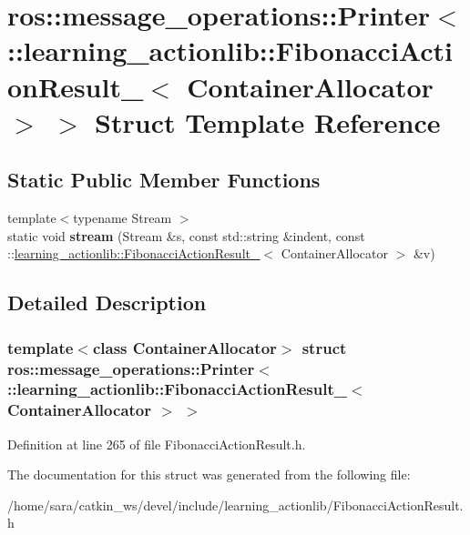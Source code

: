 \hypertarget{structros_1_1message__operations_1_1Printer_3_01_1_1learning__actionlib_1_1FibonacciActionResult378bca1585299c2b313fd76380541e51}{}\section{ros\+:\+:message\+\_\+operations\+:\+:Printer$<$ \+:\+:learning\+\_\+actionlib\+:\+:Fibonacci\+Action\+Result\+\_\+$<$ Container\+Allocator $>$ $>$ Struct Template Reference}
\label{structros_1_1message__operations_1_1Printer_3_01_1_1learning__actionlib_1_1FibonacciActionResult378bca1585299c2b313fd76380541e51}
\subsection*{Static Public Member Functions}
\begin{DoxyCompactItemize}
\item 
\mbox{\label{structros_1_1message__operations_1_1Printer_3_01_1_1learning__actionlib_1_1FibonacciActionResult378bca1585299c2b313fd76380541e51_a88661785a3e73ee7fdb40e426925f0eb}} 
{\footnotesize template$<$typename Stream $>$ }\\static void {\bfseries stream} (Stream \&s, const std\+::string \&indent, const \+::\hyperlink{structlearning__actionlib_1_1FibonacciActionResult__}{learning\+\_\+actionlib\+::\+Fibonacci\+Action\+Result\+\_\+}$<$ Container\+Allocator $>$ \&v)
\end{DoxyCompactItemize}


\subsection{Detailed Description}
\subsubsection*{template$<$class Container\+Allocator$>$\newline
struct ros\+::message\+\_\+operations\+::\+Printer$<$ \+::learning\+\_\+actionlib\+::\+Fibonacci\+Action\+Result\+\_\+$<$ Container\+Allocator $>$ $>$}



Definition at line 265 of file Fibonacci\+Action\+Result.\+h.



The documentation for this struct was generated from the following file\+:\begin{DoxyCompactItemize}
\item 
/home/sara/catkin\+\_\+ws/devel/include/learning\+\_\+actionlib/Fibonacci\+Action\+Result.\+h\end{DoxyCompactItemize}
